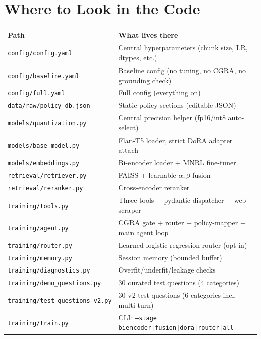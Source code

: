 \documentclass[11pt,a4paper]{article}
\begin{document}
\clearpage
\section{Where to Look in the Code}

\begin{center}
\small
\begin{tabular}{@{}lp{9.5cm}@{}}
\toprule
\textbf{Path} & \textbf{What lives there} \\
\midrule
\texttt{config/config.yaml}         & Central hyperparameters (chunk size, LR, dtypes, etc.) \\
\texttt{config/baseline.yaml}       & Baseline config (no tuning, no CGRA, no grounding check) \\
\texttt{config/full.yaml}           & Full config (everything on) \\
\texttt{data/raw/policy\_db.json}   & Static policy sections (editable JSON) \\
\texttt{models/quantization.py}     & Central precision helper (fp16/int8 auto-select) \\
\texttt{models/base\_model.py}      & Flan-T5 loader, strict DoRA adapter attach \\
\texttt{models/embeddings.py}       & Bi-encoder loader + MNRL fine-tuner \\
\texttt{retrieval/retriever.py}     & FAISS + learnable $\alpha,\beta$ fusion \\
\texttt{retrieval/reranker.py}      & Cross-encoder reranker \\
\texttt{training/tools.py}          & Three tools + pydantic dispatcher + web scraper \\
\texttt{training/agent.py}          & CGRA gate + router + policy-mapper + main agent loop \\
\texttt{training/router.py}         & Learned logistic-regression router (opt-in) \\
\texttt{training/memory.py}         & Session memory (bounded buffer) \\
\texttt{training/diagnostics.py}    & Overfit/underfit/leakage checks \\
\texttt{training/demo\_questions.py} & 30 curated test questions (4 categories) \\
\texttt{training/test\_questions\_v2.py} & 30 v2 test questions (6 categories incl. multi-turn) \\
\texttt{training/train.py}          & CLI: \texttt{--stage biencoder|fusion|dora|router|all} \\

\end{tabular}
\end{center}
\end{document}
